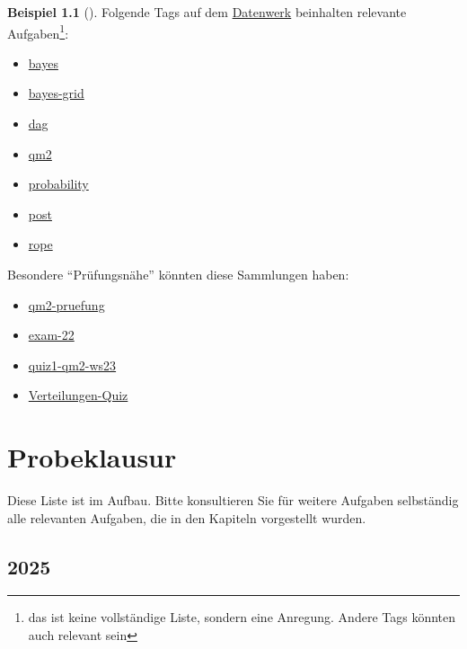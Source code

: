\documentclass[
  ngerman,
  letterpaper,
  twoside,
  open=any]{scrbook}
\providecommand{\tightlist}{%
  \setlength{\itemsep}{0pt}\setlength{\parskip}{0pt}}\usepackage{longtable,booktabs,array}
\theoremstyle{definition}
\newtheorem{example}{Beispiel}[chapter]
\theoremstyle{plain}
\theoremstyle{definition}
\theoremstyle{definition}
\theoremstyle{remark}
\begin{document}
\begin{example}[]
Folgende Tags auf dem \href{https://datenwerk.netlify.app/}{Datenwerk}
beinhalten relevante Aufgaben\footnote{das ist keine vollständige Liste,
  sondern eine Anregung. Andere Tags könnten auch relevant sein}:

\begin{itemize}
\tightlist
\item
  \href{https://datenwerk.netlify.app/\#category=bayes}{bayes}
\item
  \href{https://datenwerk.netlify.app/\#category=bayes-grid}{bayes-grid}
\item
  \href{https://datenwerk.netlify.app/\#category=dag}{dag}
\item
  \href{https://datenwerk.netlify.app/\#category=dag}{qm2}
\item
  \href{https://datenwerk.netlify.app/\#category=probability}{probability}
\item
  \href{https://datenwerk.netlify.app/\#category=post}{post}
\item
  \href{https://datenwerk.netlify.app/\#category=rope}{rope}
\end{itemize}

Besondere \enquote{Prüfungsnähe} könnten diese Sammlungen haben:

\begin{itemize}
\tightlist
\item
  \href{https://datenwerk.netlify.app/\#category=qm2-pruefung}{qm2-pruefung}
\item
  \href{https://datenwerk.netlify.app/\#category=exam-22}{exam-22}
\item
  \href{https://datenwerk.netlify.app/\#category=quiz1-qm2-ws23}{quiz1-qm2-ws23}
\item
  \href{https://datenwerk.netlify.app/\#category=Verteilungen-Quiz}{Verteilungen-Quiz}
\end{itemize}

\chapter{Probeklausur}\label{probeklausur}

Diese Liste ist im Aufbau. Bitte konsultieren Sie für weitere Aufgaben
selbständig alle relevanten Aufgaben, die in den Kapiteln vorgestellt
wurden.

\section{2025}\label{section-16}


\end{example}
\end{document}
